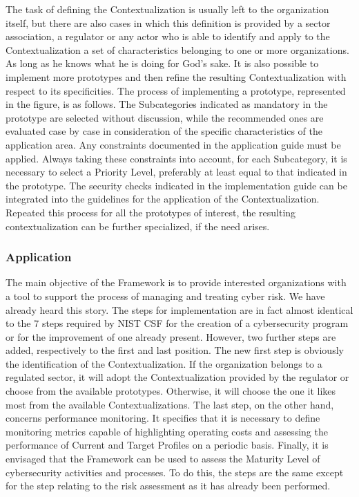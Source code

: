 The task of defining the Contextualization is usually left to the organization itself, but there are also cases in which this definition is provided by a sector association, a regulator or any actor who is able to identify and apply to the Contextualization a set of characteristics belonging to one or more organizations. As long as he knows what he is doing for God's sake. It is also possible to implement more prototypes and then refine the resulting Contextualization with respect to its specificities. The process of implementing a prototype, represented in the figure, is as follows. The Subcategories indicated as mandatory in the prototype are selected without discussion, while the recommended ones are evaluated case by case in consideration of the specific characteristics of the application area. Any constraints documented in the application guide must be applied. Always taking these constraints into account, for each Subcategory, it is necessary to select a Priority Level, preferably at least equal to that indicated in the prototype. The security checks indicated in the implementation guide can be integrated into the guidelines for the application of the Contextualization. Repeated this process for all the prototypes of interest, the resulting contextualization can be further specialized, if the need arises.
\subsubsection{Application}
The main objective of the Framework is to provide interested organizations with a tool to support the process of managing and treating cyber risk. We have already heard this story. The steps for implementation are in fact almost identical to the 7 steps required by NIST CSF for the creation of a cybersecurity program or for the improvement of one already present. However, two further steps are added, respectively to the first and last position. The new first step is obviously the identification of the Contextualization. If the organization belongs to a regulated sector, it will adopt the Contextualization provided by the regulator or choose from the available prototypes. Otherwise, it will choose the one it likes most from the available Contextualizations. The last step, on the other hand, concerns performance monitoring. It specifies that it is necessary to define monitoring metrics capable of highlighting operating costs and assessing the performance of Current and Target Profiles on a periodic basis.\newline
Finally, it is envisaged that the Framework can be used to assess the Maturity Level of cybersecurity activities and processes. To do this, the steps are the same except for the step relating to the risk assessment as it has already been performed.
